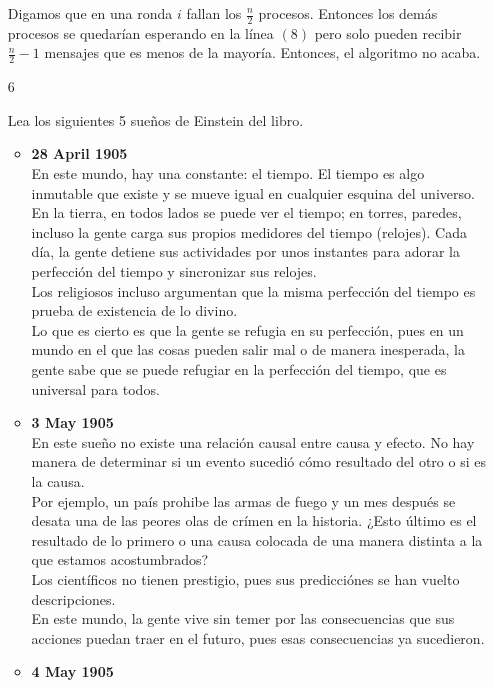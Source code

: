 \documentclass[12pt,a4paper]{report}
\begin{document}
\begin{itemize}
{    Digamos que en una ronda $i$ fallan los $\tfrac{n}{2}$ procesos. Entonces
    los demás procesos se quedarían esperando en la línea $(8)$ pero solo pueden
    recibir $\tfrac{n}{2}-1$ mensajes que es menos de la mayoría. Entonces, el
    algoritmo no acaba.
}
\item[6]{Lea los siguientes 5 sueños de Einstein del libro.
    \begin{itemize}[label=$\bullet$]
        \item{\textbf{28 April 1905}\\
            En este mundo, hay una constante: el tiempo. El tiempo es algo
            inmutable que existe y se mueve igual en cualquier esquina del
            universo. En la tierra, en todos lados se puede ver el tiempo; en
            torres, paredes, incluso la gente carga sus propios medidores del
            tiempo (relojes). Cada día, la gente detiene sus actividades por
            unos instantes para adorar la perfección del tiempo y sincronizar
            sus relojes.\\
            Los religiosos incluso argumentan que la misma perfección del tiempo
            es prueba de existencia de lo divino.\\
            Lo que es cierto es que la gente se refugia en su perfección, pues
            en un mundo en el que las cosas pueden salir mal o de manera
            inesperada, la gente sabe que se puede refugiar en la perfección del
            tiempo, que es universal para todos.
        }
        \item{\textbf{3 May 1905}\\
            En este sueño no existe una relación causal entre causa y efecto. No
            hay manera de determinar si un evento sucedió cómo resultado del
            otro o si es la causa.\\
            Por ejemplo, un país prohibe las armas de fuego y un mes después se
            desata una de las peores olas de crímen en la historia. ¿Esto
            último es el resultado de lo primero o una causa colocada de una
            manera distinta a la que estamos acostumbrados?\\
            Los científicos no tienen prestigio, pues sus predicciónes se han
            vuelto descripciones. \\
            En este mundo, la gente vive sin temer por las consecuencias que sus
            acciones puedan traer en el futuro, pues esas consecuencias ya
            sucedieron.
        }
        \item{\textbf{4 May 1905}\\
}
\end{itemize}}
\end{itemize}
\end{document}
